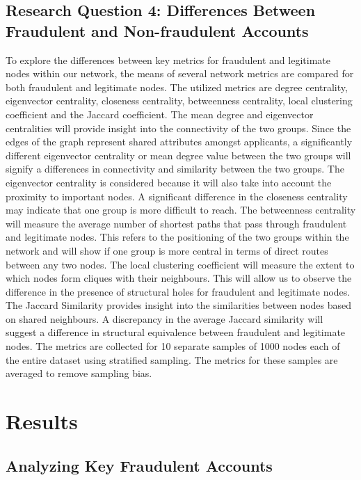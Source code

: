 \documentclass{styles/svproc}
\begin{document}
\subsection*{Research Question 4: Differences Between Fraudulent and Non-fraudulent Accounts}
To explore the differences between key metrics for fraudulent and legitimate nodes within our network, the means of several network metrics are compared for both fraudulent and legitimate nodes. The utilized metrics are degree centrality, eigenvector centrality, closeness centrality, betweenness centrality, local clustering coefficient and the Jaccard coefficient. The mean degree and eigenvector centralities will provide insight into the connectivity of the two groups. Since the edges of the graph represent shared attributes amongst applicants, a significantly different eigenvector centrality or mean degree value between the two groups will signify a differences in connectivity and similarity between the two groups. The eigenvector centrality is considered because it will also take into account the proximity to important nodes. A significant difference in the closeness centrality may indicate that one group is more difficult to reach. The betweenness centrality will measure the average number of shortest paths that pass through fraudulent and legitimate nodes. This refers to the positioning of the two groups within the network and will show if one group is more central in terms of direct routes between any two nodes. The local clustering coefficient will measure the extent to which nodes form cliques with their neighbours. This will allow us to observe the difference in the presence of structural holes for fraudulent and legitimate nodes. The Jaccard Similarity provides insight into the similarities between nodes based on shared neighbours. A discrepancy in the average Jaccard similarity will suggest a difference in structural equivalence between fraudulent and legitimate nodes. The metrics are collected for 10 separate samples of 1000 nodes each of the entire dataset using stratified sampling. The metrics for these samples are averaged to remove sampling bias.

\section{Results}

\subsection{Analyzing Key Fraudulent Accounts}
\end{document}
